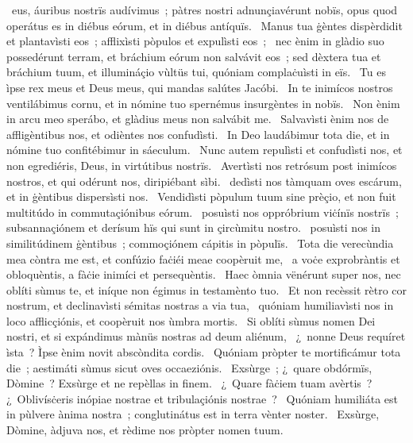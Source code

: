 { }
{%
~eus, áuribus nostrïs audívimus~; pàtres nostri adnunçiavérunt nobïs, opus quod operátus es in diébus eórum, et in diébus antíquïs. 
~Manus tua ġèntes dispèrdidit et plantavìsti eos~; afflixìsti pòpulos et expulìsti eos~; 
~nec ènim in glàdio suo possedérunt terram, et bráchium eórum non salvávit eos~; sed dèxtera tua et bráchium tuum, et illumináçio vùltüs tui, quóniam complaċuìsti in eïs. 
~Tu es ìpse rex meus et Deus meus, qui mandas salútes Jacóbi. 
~In te inimícos nostros ventilábimus cornu, et in nómine tuo spernémus insurgèntes in nobïs. 
~Non ènim in arcu meo sperábo, et glàdius meus non salvábit me. 
~Salvavìsti ènim nos de affligèntibus nos, et odièntes nos confudìsti. 
~In Deo laudábimur tota die, et in nómine tuo confitébimur in sáeculum. 
~Nunc autem repulìsti et confudìsti nos, et non egrediéris, Deus, in virtútibus nostrïs. 
~Avertìsti nos retrósum post inimícos nostros, et qui odérunt nos, diripiébant sìbi. 
~dedìsti nos tàmquam oves escárum, et in ġèntibus dispersìsti nos. 
~Vendidìsti pòpulum tuum sine prèçio, et non fuit multitúdo in commutaçiónibus eórum. 
~posuìsti nos oppróbrium viċínïs nostrïs~; subsannaçiónem et derísum hïs qui sunt in çircùmitu nostro. 
~posuìsti nos in similitúdinem ġèntibus~; commoçiónem cápitis in pòpulïs. 
~Tota die verecùndia mea còntra me est, et confúzio faċiéi meae coopèruit me, 
~a voċe exprobràntis et obloquèntis, a fàċie inimíci et persequèntis. 
~Haec òmnia vënérunt super nos, nec oblíti sùmus te, et iníque non égimus in testamènto tuo. 
~Et non recèssit rètro cor nostrum, et declinavìsti sémitas nostras a via tua, 
~quóniam humiliavìsti nos in loco afflicçiónis, et coopèruit nos ùmbra mortis. 
~Si oblíti sùmus nomen Dei nostri, et si expándimus mànüs nostras ad deum aliénum, 
~¿~nonne Deus requíret ìsta~? Ìpse ènim novit abscòndita cordis. 
~Quóniam pròpter te mortificámur tota die~; aestimáti sùmus sicut oves occaeziónis. 
~Exsùrge~; ¿~quare obdórmïs, Dòmine~? Exsùrge et ne repèllas in finem. 
~¿~Quare fàċiem tuam avèrtis~? ¿~Oblivísċeris inópiae nostrae et tribulaçiónis nostrae~? 
~Quóniam humiliáta est in pùlvere ànima nostra~; conglutinátus est in terra vènter noster. 
~Exsùrge, Dòmine, àdjuva nos, et rèdime nos pròpter nomen tuum. 
}
